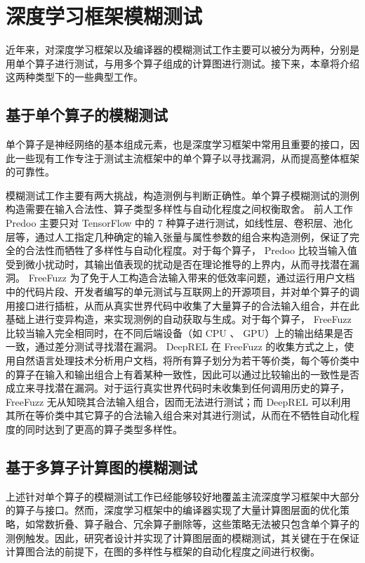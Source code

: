 \section{深度学习框架模糊测试}

近年来，对深度学习框架以及编译器的模糊测试工作主要可以被分为两种，分别是用单个算子进行测试，与用多个算子组成的计算图进行测试。接下来，本章将介绍这两种类型下的一些典型工作。

\subsection{基于单个算子的模糊测试}

单个算子是神经网络的基本组成元素，也是深度学习框架中常用且重要的接口，因此一些现有工作专注于测试主流框架中的单个算子以寻找漏洞，从而提高整体框架的可靠性。

模糊测试工作主要有两大挑战，构造测例与判断正确性。单个算子模糊测试的测例构造需要在输入合法性、算子类型多样性与自动化程度之间权衡取舍。
前人工作 Predoo\cite{predoo} 主要只对 TensorFlow 中的 7 种算子进行测试，如线性层、卷积层、池化层等，通过人工指定几种确定的输入张量与属性参数的组合来构造测例，保证了完全的合法性而牺牲了多样性与自动化程度。对于每个算子， Predoo 比较当输入值受到微小扰动时，其输出值表现的扰动是否在理论推导的上界内，从而寻找潜在漏洞。
FreeFuzz\cite{freefuzz} 为了免于人工构造合法输入带来的低效率问题，通过运行用户文档中的代码片段、开发者编写的单元测试与互联网上的开源项目，并对单个算子的调用接口进行插桩，从而从真实世界代码中收集了大量算子的合法输入组合，并在此基础上进行变异构造，来实现测例的自动获取与生成。对于每个算子， FreeFuzz 比较当输入完全相同时，在不同后端设备（如 CPU 、 GPU）上的输出结果是否一致，通过差分测试寻找潜在漏洞。
DeepREL\cite{deeprel} 在 FreeFuzz 的收集方式之上，使用自然语言处理技术分析用户文档，将所有算子划分为若干等价类，每个等价类中的算子在输入和输出组合上有着某种一致性，因此可以通过比较输出的一致性是否成立来寻找潜在漏洞。对于运行真实世界代码时未收集到任何调用历史的算子， FreeFuzz 无从知晓其合法输入组合，因而无法进行测试；而 DeepREL 可以利用其所在等价类中其它算子的合法输入组合来对其进行测试，从而在不牺牲自动化程度的同时达到了更高的算子类型多样性。

\subsection{基于多算子计算图的模糊测试}

上述针对单个算子的模糊测试工作已经能够较好地覆盖主流深度学习框架中大部分的算子与接口。然而，深度学习框架中的编译器实现了大量计算图层面的优化策略，如常数折叠、算子融合、冗余算子删除等，这些策略无法被只包含单个算子的测例触发。因此，研究者设计并实现了计算图层面的模糊测试，其关键在于在保证计算图合法的前提下，在图的多样性与框架的自动化程度之间进行权衡。

